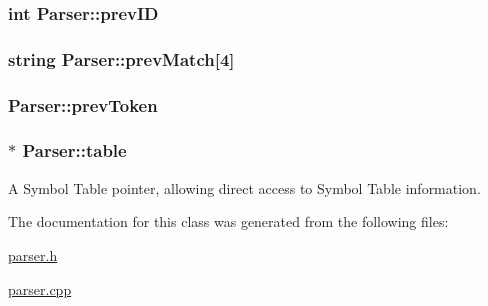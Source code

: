 \hypertarget{classParser_a4068ed26fd5e4ea914a05979ba4d792c}{
\subsubsection[{prevID}]{\setlength{\rightskip}{0pt plus 5cm}int {\bf Parser::prevID}}}
\label{classParser_a4068ed26fd5e4ea914a05979ba4d792c}
\hypertarget{classParser_aeee13154ac5d45a615a57fd4d982487b}{
\subsubsection[{prevMatch}]{\setlength{\rightskip}{0pt plus 5cm}string {\bf Parser::prevMatch}\mbox{[}4\mbox{]}}}
\label{classParser_aeee13154ac5d45a615a57fd4d982487b}
\hypertarget{classParser_aa77efdbbc573c3c89169e199b996e0a1}{
\subsubsection[{prevToken}]{ {\bf Parser::prevToken}}}
\label{classParser_aa77efdbbc573c3c89169e199b996e0a1}
\hypertarget{classParser_aa5635cdb5fc754cc3ea8b85eca02dfda}{
\subsubsection[{table}]{$\ast$ {\bf Parser::table}}}
\label{classParser_aa5635cdb5fc754cc3ea8b85eca02dfda}


A Symbol Table pointer, allowing direct access to Symbol Table information. 



The documentation for this class was generated from the following files:\begin{DoxyCompactItemize}
\item 
\hyperlink{parser_8h}{parser.h}\item 
\hyperlink{parser_8cpp}{parser.cpp}\end{DoxyCompactItemize}
